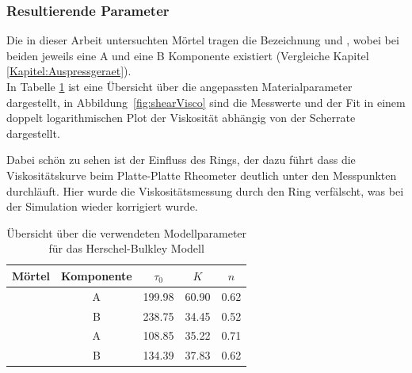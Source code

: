 \subsubsection{Resultierende Parameter}
Die in dieser Arbeit untersuchten Mörtel tragen die Bezeichnung \hit{} und \re{}, wobei bei beiden jeweils eine A und eine B Komponente existiert (Vergleiche Kapitel \ref{Kapitel:Auspressgeraet}).\\
In Tabelle \ref{fig:resultParameter} ist eine Übersicht über die angepassten Materialparameter dargestellt, in Abbildung~\ref{fig:shearVisco} sind die Messwerte und der Fit in einem doppelt logarithmischen Plot der Viskosität abhängig von der Scherrate dargestellt.

Dabei schön zu sehen ist der Einfluss des Rings, der dazu führt dass die Viskositätskurve beim Platte-Platte Rheometer deutlich unter den Messpunkten durchläuft.
Hier wurde die Viskositätsmessung durch den Ring verfälscht, was bei der Simulation wieder korrigiert wurde.
\begin{table}
    \centering
    \begin{tabular}{l c l l l}
        \textbf{Mörtel} & \textbf{Komponente} & 
        \multicolumn{1}{c}{$\tau_0$} &
        \multicolumn{1}{c}{$K$} &
        \multicolumn{1}{c}{$n$} \\
        \hline
        \hline
        \multirow{2}{*}{\hit{}} & A & 199.98& 60.90& 0.62\\ 
        & B & 238.75& 34.45& 0.52\\ 
        \hline
        \multirow{2}{*}{\re{}}  & A & 108.85& 35.22& 0.71\\ 
        & B & 134.39& 37.83& 0.62
    \end{tabular}
    \caption{Übersicht über die verwendeten Modellparameter für das Herschel-Bulkley Modell}
    \label{fig:resultParameter}
\end{table}
%
